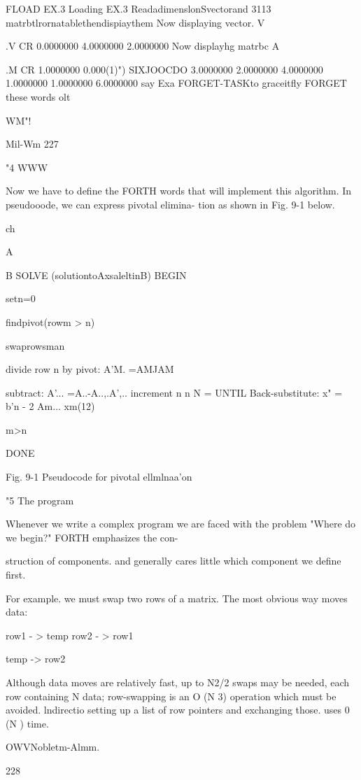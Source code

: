 FLOAD EX.3 Loading EX.3
ReadadimenslonSvectorand 3113 matrbtlrornatablethendispiaythem
Now displaying vector.
V{ .V CR
0.0000000
4.0000000
2.0000000
Now displayhg matrbc
A{{ .M CR
1.0000000 0.000(1)") SIXJOOCDO
3.0000000 2.0000000 4.0000000
1.0000000 1.0000000 6.0000000
say Exa FORGET-TASKto graceitfly FORGET these words olt

WM"!

Mil-Wm 227

"4 WWW

Now we have to define the FORTH words that will implement
this algorithm. In pseudooode, we can express pivotal elimina-
tion as shown in Fig. 9-1 below.

 

ch

 

 

 

A{{ B{ }}SOLVE (solutiontoAxsaleltinB)
BEGIN

setn=0

findpivot(rowm > n)

swaprowsman

divide row n by pivot: A'M. =AMJAM

subtract: A'... =A..-A..,.A',..
increment n
n N =
UNTIL
Back-substitute: x" = b'n - 2 Am... xm(12)

m>n

DONE

 

 

Fig. 9-1 Pseudocode for pivotal ellmlnaa'on

"5 The program

Whenever we write a complex program we are faced with the
problem "Where do we begin?" FORTH emphasizes the con-

struction of components. and generally cares little which component
we define first.

For example. we must swap two rows of a matrix. The most
obvious way moves data:

row1 - > temp
row2 - > row1

temp -> row2

Although data moves are relatively fast, up to N2/2 swaps may be
needed, each row containing N data; row-swapping is an O (N 3)
operation which must be avoided. lndirectio setting up a list of
row pointers and exchanging those. uses 0 (N ) time.

OWVNobletm-Almm.

228

}}}}
